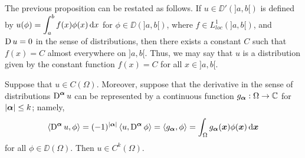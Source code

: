 The previous proposition can be restated as follows.  If
$u \in \DD'(]a,b[)$ is defined by
$\displaystyle u(\phi) = \int_a^b f(x) \phi(x) \,\mathrm{d}{x}$ for
$\phi \in \DD(]a,b[)$, where $\displaystyle f \in L_{loc}^1(]a,b[)$, and
$\operatorname{D} u = 0$ in the sense of distributions, then there exists a constant
$C$ such that $f(x) = C$ almost everywhere on $]a,b[$.  Thus, we may
say that $u$ is a distribution given by the constant function
$f(x) = C$ for all $x \in ]a,b[$.

\begin{prop} \label{distr_cdistr_cder}
Suppose that $u \in C(\Omega)$.  Moreover, suppose that the derivative
in the sense of distributions $\displaystyle \operatorname{D}^{{\bm{\alpha}}} u$ can be
represented by a continuous function $g_{{\bm{\alpha}}}:\Omega \to \mathbb{C}$ for
$|{\bm{\alpha}}|\leq k$; namely,
\[
\left\langle{\operatorname{D}^{{\bm{\alpha}}} u} , {\phi}\right\rangle = (-1)^{|{\bm{\alpha}}|}
\left\langle{u} , {\operatorname{D}^{{\bm{\alpha}}}\phi}\right\rangle
= \left\langle{g_{{\bm{\alpha}}}} , {\phi}\right\rangle = \int_{\Omega} g_{{\bm{\alpha}}}({\bm{x}})
\phi({\bm{x}}) \,\mathrm{d}{{\bm{x}}}
\]
for all $\phi \in \DD(\Omega)$.  Then
$\displaystyle u \in C^k(\Omega)$.
\end{prop}


